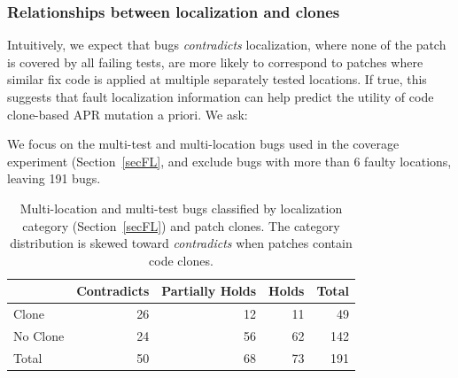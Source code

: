 \documentclass[10pt, conference]{IEEEtran}
\begin{document}
\subsubsection{Relationships between localization and clones}
Intuitively, we expect that bugs  \emph{contradicts} localization, where none of the patch is 
covered by all failing tests, are more likely to correspond to patches where
similar fix code is applied at multiple separately tested locations. If 
true, this suggests that fault localization information can help 
predict the utility of code clone-based APR mutation a priori. We ask:


%
We focus on the multi-test and multi-location bugs used in the coverage 
experiment (Section~\ref{secFL}, and exclude bugs with more than 6 faulty locations, leaving 191 bugs.

\begin{table}
  {\begin{center}
      \begin{tabular} {lrrrr}
        \toprule
        & Contradicts & Partially Holds & Holds & Total \\
        \midrule
        Clone & 26 & 12 & 11 &  49 \\
        No Clone  & 24 & 56 & 62 & 142 \\
        \midrule
        Total     & 50 & 68 & 73 & 191 \\
        \bottomrule
      \end{tabular}
    \end{center}
  }

  \caption{\small Multi-location and multi-test bugs classified by localization
    category (Section~\ref{secFL}) and patch clones. The category distribution
    is skewed toward \emph{contradicts} when patches contain code clones.}
  \label{tab:cov_clones}
\end{table}
\end{document}
